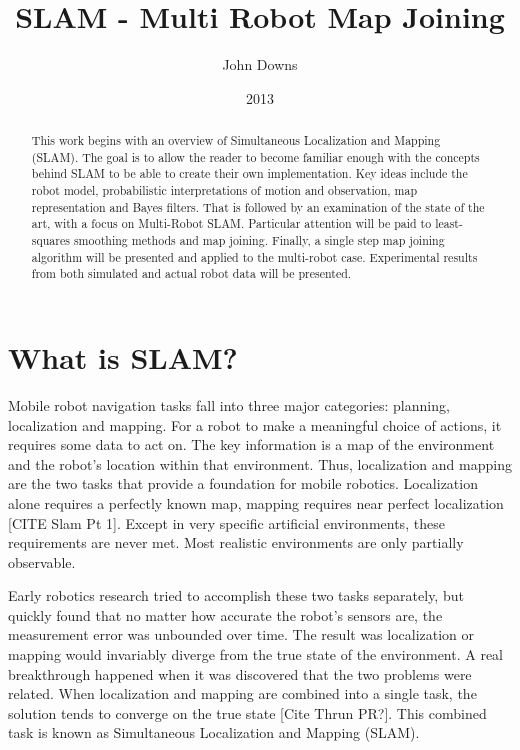 \documentclass[12pt]{article}
\title{SLAM - Multi Robot Map Joining}
\author{John Downs}
\date{2013}
\begin{document}
\maketitle

\begin{abstract}
This work begins with an overview of Simultaneous Localization and Mapping (SLAM).  The goal is to allow the reader to become familiar enough with the concepts behind SLAM to be able to create their own implementation.  Key ideas include the robot model, probabilistic interpretations of motion and observation, map representation and Bayes filters.  That is followed by an examination of the state of the art, with a focus on Multi-Robot SLAM.  Particular attention will be paid to least-squares smoothing methods and map joining.  Finally, a single step map joining algorithm will be presented and applied to the multi-robot case.  Experimental results from both simulated and actual robot data will be presented.  
\end{abstract}

\section{What is SLAM?}

Mobile robot navigation tasks fall into three major categories: planning, localization and mapping.  For a robot to make a meaningful choice of actions, it requires some data to act on.  The key information is a map of the environment and the robot's location within that environment.  Thus, localization and mapping are the two tasks that provide a foundation for mobile robotics.  Localization alone requires a perfectly known map, mapping requires near perfect localization [CITE Slam Pt 1].  Except in very specific artificial environments, these requirements are never met.  Most realistic environments are only partially observable.  

Early robotics research tried to accomplish these two tasks separately, but quickly found that no matter how accurate the robot's sensors are, the measurement error was unbounded over time.  The result was localization or mapping would invariably diverge from the true state of the environment.  A real breakthrough happened when it was discovered that the two problems were related.  When localization and mapping are combined into a single task, the solution tends to converge on the true state [Cite Thrun PR?].  This combined task is known as Simultaneous Localization and Mapping (SLAM).
\end{document}
